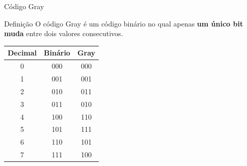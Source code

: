 \begin{frame}{Código Gray}
    \small

    \begin{block}{Definição}
        O código Gray é um código binário no qual apenas
        \textbf{um único bit muda} entre dois valores consecutivos.
    \end{block}

    \vspace{0.2cm}

    \begin{center}
        \begin{tabular}{c|c|c}
            \textbf{Decimal} & \textbf{Binário} & \textbf{Gray} \\ \hline
            0 & 000 & 000 \\
            1 & 001 & 001 \\
            2 & 010 & 011 \\
            3 & 011 & 010 \\
            4 & 100 & 110 \\
            5 & 101 & 111 \\
            6 & 110 & 101 \\
            7 & 111 & 100
        \end{tabular}
    \end{center}

\end{frame}